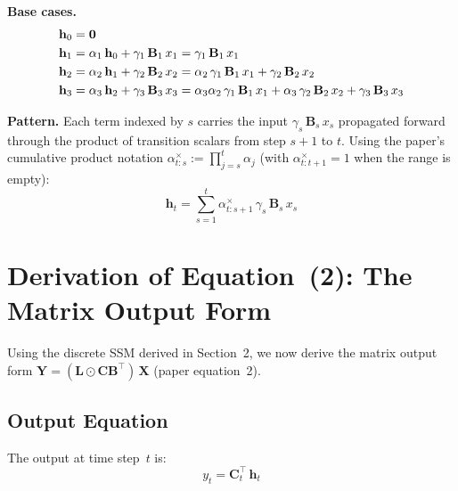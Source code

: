\documentclass[11pt,a4paper]{article}
\begin{document}
\medskip\noindent\textbf{Base cases.}\quad
\begin{align}
  \mathbf{h}_0 &= \mathbf{0} \notag\\
  \mathbf{h}_1 &= \alpha_1\,\mathbf{h}_0 + \gamma_1\,\mathbf{B}_1\,x_1
                 = \gamma_1\,\mathbf{B}_1\,x_1 \notag\\
  \mathbf{h}_2 &= \alpha_2\,\mathbf{h}_1 + \gamma_2\,\mathbf{B}_2\,x_2
                 = \alpha_2\,\gamma_1\,\mathbf{B}_1\,x_1
                   + \gamma_2\,\mathbf{B}_2\,x_2 \notag\\
  \mathbf{h}_3 &= \alpha_3\,\mathbf{h}_2 + \gamma_3\,\mathbf{B}_3\,x_3
                 = \alpha_3\alpha_2\,\gamma_1\,\mathbf{B}_1\,x_1
                   + \alpha_3\,\gamma_2\,\mathbf{B}_2\,x_2
                   + \gamma_3\,\mathbf{B}_3\,x_3
\end{align}

\medskip\noindent\textbf{Pattern.}\quad
Each term indexed by $s$ carries the input $\gamma_s\,\mathbf{B}_s\,x_s$ propagated forward through the product of transition scalars from step $s{+}1$ to $t$.
Using the paper's cumulative product notation $\alpha_{t:s}^\times := \prod_{j=s}^{t}\alpha_j$ (with $\alpha_{t:t+1}^\times = 1$ when the range is empty):
\begin{equation}\label{eq:unrolled}
  \mathbf{h}_t = \sum_{s=1}^{t}\alpha_{t:s+1}^\times\,\gamma_s\,\mathbf{B}_s\,x_s
\end{equation}

\section{Derivation of Equation~(2): The Matrix Output Form}\label{sec:matrix-form}

Using the discrete SSM derived in Section~2, we now derive the matrix output form $\mathbf{Y} = (\mathbf{L}\odot\mathbf{C}\mathbf{B}^\top)\,\mathbf{X}$ (paper equation~2).

\subsection{Output Equation}

The output at time step~$t$ is:
\begin{equation}\label{eq:output}
  y_t = \mathbf{C}_t^\top\,\mathbf{h}_t
\end{equation}
\end{document}
